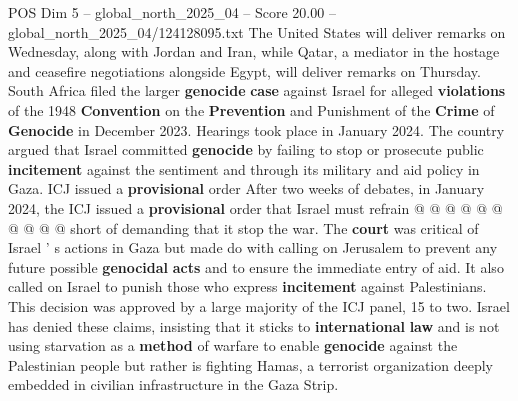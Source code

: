 \begin{textsample}{POS Dim 5 – global\_north\_2025\_04 – Score 20.00 – global\_north\_2025\_04/124128095.txt}
The United States will deliver remarks on Wednesday, along with Jordan and Iran, while Qatar, a mediator in the hostage and ceasefire negotiations alongside Egypt, will deliver remarks on Thursday.
South Africa filed the larger \textbf{genocide} \textbf{case} against Israel for alleged \textbf{violations} of the 1948 \textbf{Convention} on the \textbf{Prevention} and Punishment of the \textbf{Crime} of \textbf{Genocide} in December 2023.
Hearings took place in January 2024.
The country argued that Israel committed \textbf{genocide} by failing to stop or prosecute public \textbf{incitement} against the sentiment and through its military and aid policy in Gaza.
ICJ issued a \textbf{provisional} order After two weeks of debates, in January 2024, the ICJ issued a \textbf{provisional} order that Israel must refrain @ @ @ @ @ @ @ @ @ @ short of demanding that it stop the war.
The \textbf{court} was critical of Israel ' s actions in Gaza but made do with calling on Jerusalem to prevent any future possible \textbf{genocidal} \textbf{acts} and to ensure the immediate entry of aid.
It also called on Israel to punish those who express \textbf{incitement} against Palestinians.
This decision was approved by a large majority of the ICJ panel, 15 to two.
Israel has denied these claims, insisting that it sticks to \textbf{international} \textbf{law} and is not using starvation as a \textbf{method} of warfare to enable \textbf{genocide} against the Palestinian people but rather is fighting Hamas, a terrorist organization deeply embedded in civilian infrastructure in the Gaza Strip.

\end{textsample}
